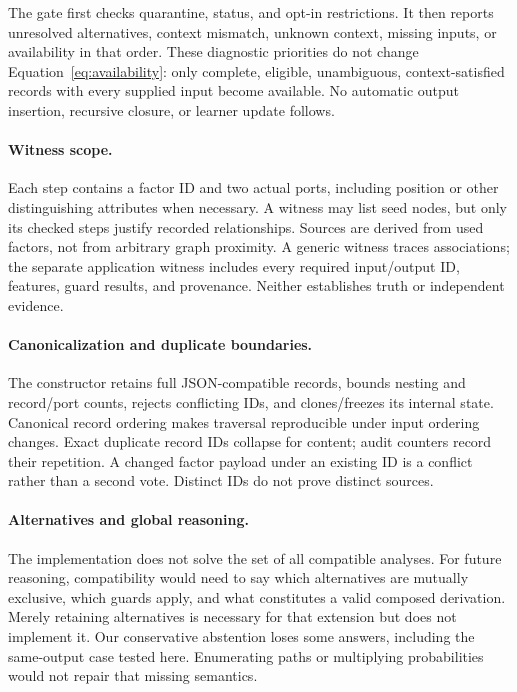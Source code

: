 \documentclass{article}
\begin{document}
The gate first checks quarantine, status, and opt-in restrictions. It then reports unresolved alternatives, context mismatch, unknown context, missing inputs, or availability in that order. These diagnostic priorities do not change Equation~\ref{eq:availability}: only complete, eligible, unambiguous, context-satisfied records with every supplied input become available. No automatic output insertion, recursive closure, or learner update follows.

\paragraph{Witness scope.}
Each step contains a factor ID and two actual ports, including position or other distinguishing attributes when necessary. A witness may list seed nodes, but only its checked steps justify recorded relationships. Sources are derived from used factors, not from arbitrary graph proximity. A generic witness traces associations; the separate application witness includes every required input/output ID, features, guard results, and provenance. Neither establishes truth or independent evidence.

\paragraph{Canonicalization and duplicate boundaries.}
The constructor retains full JSON-compatible records, bounds nesting and record/port counts, rejects conflicting IDs, and clones/freezes its internal state. Canonical record ordering makes traversal reproducible under input ordering changes. Exact duplicate record IDs collapse for content; audit counters record their repetition. A changed factor payload under an existing ID is a conflict rather than a second vote. Distinct IDs do not prove distinct sources.

\paragraph{Alternatives and global reasoning.}
The implementation does not solve the set of all compatible analyses. For future reasoning, compatibility would need to say which alternatives are mutually exclusive, which guards apply, and what constitutes a valid composed derivation. Merely retaining alternatives is necessary for that extension but does not implement it. Our conservative abstention loses some answers, including the same-output case tested here. Enumerating paths or multiplying probabilities would not repair that missing semantics.
\end{document}
